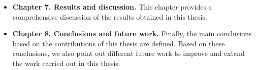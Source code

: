 \begin{itemize}
\item \textbf{Chapter 7. Results and discussion.} This chapter provides a comprehensive discussion of the results obtained in this thesis.
\item \textbf{Chapter 8. Conclusions and future work.} Finally, the main conclusions based on the contributions of this thesis are defined. Based on these conclusions, we  also point out different future work to improve and extend the work carried out in this thesis.   
\end{itemize}

